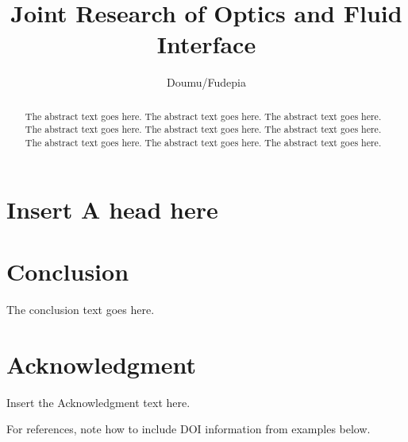 \documentclass[preprint]{ptephy_v1}%
\begin{document}
\title{Joint Research of Optics and Fluid Interface}


\author{Doumu/Fudepia}

\begin{abstract}
The abstract text goes here. The abstract text goes here. The abstract text goes here.
The abstract text goes here. The abstract text goes here. The abstract text goes here.
The abstract text goes here. The abstract text goes here. The abstract text goes here.
\end{abstract}



\maketitle


\section{Insert A head here}





\section{Conclusion}
The conclusion text goes here.

\section*{Acknowledgment}

Insert the Acknowledgment text here.


%
%
%

\vspace{0.2cm}
\noindent
For references,  note how to include DOI information from examples below. 


\let\doi\relax
\end{document}
